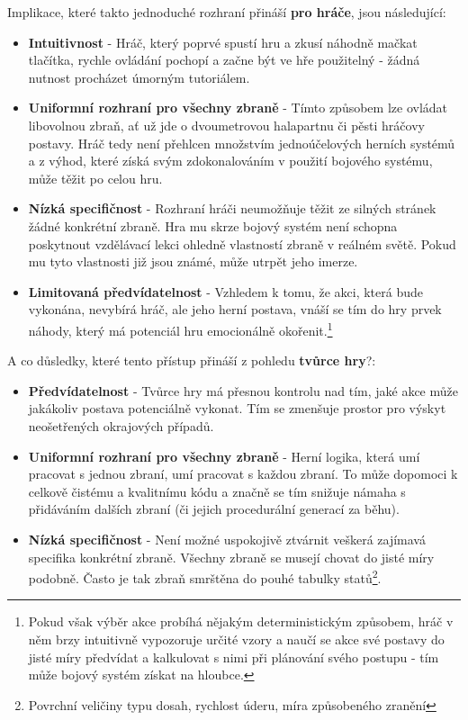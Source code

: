 Implikace, které takto jednoduché rozhraní přináší \textbf{pro hráče}, jsou následující:
\begin{itemize}
    \item \textbf{Intuitivnost} - Hráč, který poprvé spustí hru a zkusí náhodně mačkat tlačítka, rychle ovládání pochopí a začne být ve hře použitelný - žádná nutnost procházet úmorným tutoriálem.
    \item \textbf{Uniformní rozhraní pro všechny zbraně} - Tímto způsobem lze ovládat libovolnou zbraň, ať už jde o dvoumetrovou halapartnu či pěsti hráčovy postavy. Hráč tedy není přehlcen množstvím jednoúčelových herních systémů a z výhod, které získá svým zdokonalováním v použití bojového systému, může těžit po celou hru.
    \item \textbf{Nízká specifičnost} - Rozhraní hráči neumožňuje těžit ze silných stránek žádné konkrétní zbraně. Hra mu skrze bojový systém není schopna poskytnout vzdělávací lekci ohledně vlastností zbraně v reálném světě. Pokud mu tyto vlastnosti již jsou známé, může utrpět jeho imerze.
    \item \textbf{Limitovaná předvídatelnost} - Vzhledem k tomu, že akci, která bude vykonána, nevybírá hráč, ale jeho herní postava, vnáší se tím do hry prvek náhody, který má potenciál hru emocionálně okořenit.\footnote{Pokud však výběr akce probíhá nějakým deterministickým způsobem, hráč v něm brzy intuitivně vypozoruje určité vzory a naučí se akce své postavy do jisté míry předvídat a kalkulovat s nimi při plánování svého postupu - tím může bojový systém získat na hloubce.}
\end{itemize}

A co důsledky, které tento přístup přináší z pohledu \textbf{tvůrce hry}?:
\begin{itemize}
    \item \textbf{Předvídatelnost} - Tvůrce hry má přesnou kontrolu nad tím, jaké akce může jakákoliv postava potenciálně vykonat. Tím se zmenšuje prostor pro výskyt neošetřených okrajových případů.
    \item \textbf{Uniformní rozhraní pro všechny zbraně} - Herní logika, která umí pracovat s jednou zbraní, umí pracovat s každou zbraní. To může dopomoci k celkově čistému a kvalitnímu kódu a značně se tím snižuje námaha s přidáváním dalších zbraní (či jejich procedurální generací za běhu).
    \item \textbf{Nízká specifičnost} - Není možné uspokojivě ztvárnit veškerá zajímavá specifika konkrétní zbraně. Všechny zbraně se musejí chovat do jisté míry podobně. Často je tak zbraň smrštěna do pouhé tabulky statů\footnote{Povrchní veličiny typu dosah, rychlost úderu, míra způsobeného zranění}.
\end{itemize}

